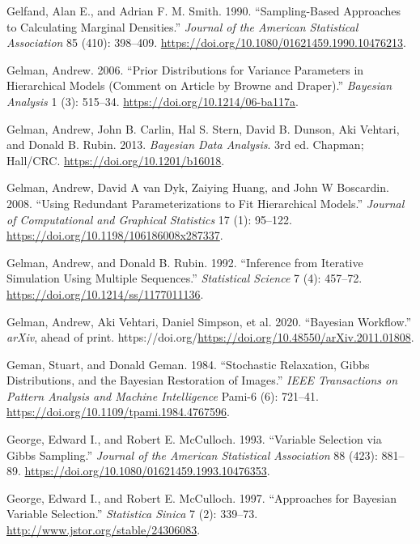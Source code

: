 \documentclass[
  11pt,
  letterpaper,
]{scrbook}
\newlength{\cslhangindent}
\newenvironment{CSLReferences}[2] %
 {\begin{list}{}{%
  \setlength{\itemindent}{0pt}
  \setlength{\leftmargin}{0pt}
  \setlength{\parsep}{0pt}
  \ifodd #1
   \setlength{\leftmargin}{\cslhangindent}
   \setlength{\itemindent}{-1\cslhangindent}
  \fi
  \setlength{\itemsep}{#2\baselineskip}}}
 {\end{list}}
\theoremstyle{definition}
\theoremstyle{plain}
\theoremstyle{plain}
\theoremstyle{plain}
\theoremstyle{definition}
\theoremstyle{definition}
\theoremstyle{plain}
\theoremstyle{plain}
\theoremstyle{remark}
\begin{document}
\begin{CSLReferences}{1}{1}
Gelfand, Alan E., and Adrian F. M. Smith. 1990. {``Sampling-Based
Approaches to Calculating Marginal Densities.''} \emph{Journal of the
American Statistical Association} 85 (410): 398--409.
\url{https://doi.org/10.1080/01621459.1990.10476213}.

Gelman, Andrew. 2006. {``Prior Distributions for Variance Parameters in
Hierarchical Models (Comment on Article by {B}rowne and {D}raper).''}
\emph{Bayesian Analysis} 1 (3): 515--34.
\url{https://doi.org/10.1214/06-ba117a}.

Gelman, Andrew, John B. Carlin, Hal S. Stern, David B. Dunson, Aki
Vehtari, and Donald B. Rubin. 2013. \emph{Bayesian Data Analysis}. 3rd
ed. Chapman; Hall/CRC. \url{https://doi.org/10.1201/b16018}.

Gelman, Andrew, David A van Dyk, Zaiying Huang, and John W Boscardin.
2008. {``Using Redundant Parameterizations to Fit Hierarchical
Models.''} \emph{Journal of Computational and Graphical Statistics} 17
(1): 95--122. \url{https://doi.org/10.1198/106186008x287337}.

Gelman, Andrew, and Donald B. Rubin. 1992. {``Inference from Iterative
Simulation Using Multiple Sequences.''} \emph{Statistical Science} 7
(4): 457--72. \url{https://doi.org/10.1214/ss/1177011136}.

Gelman, Andrew, Aki Vehtari, Daniel Simpson, et al. 2020. {``Bayesian
Workflow.''} \emph{arXiv}, ahead of print.
https://doi.org/\url{https://doi.org/10.48550/arXiv.2011.01808}.

Geman, Stuart, and Donald Geman. 1984. {``Stochastic Relaxation, {G}ibbs
Distributions, and the {B}ayesian Restoration of Images.''} \emph{IEEE
Transactions on Pattern Analysis and Machine Intelligence} Pami-6 (6):
721--41. \url{https://doi.org/10.1109/tpami.1984.4767596}.

George, Edward I., and Robert E. McCulloch. 1993. {``Variable Selection
via {G}ibbs Sampling.''} \emph{Journal of the American Statistical
Association} 88 (423): 881--89.
\url{https://doi.org/10.1080/01621459.1993.10476353}.

George, Edward I., and Robert E. McCulloch. 1997. {``Approaches for
{B}ayesian Variable Selection.''} \emph{Statistica Sinica} 7 (2):
339--73. \url{http://www.jstor.org/stable/24306083}.


\end{CSLReferences}
\end{document}
